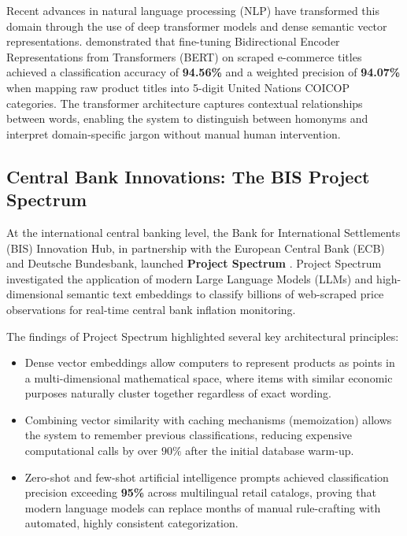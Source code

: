 \hs Recent advances in natural language processing (NLP) have transformed this domain through the use of deep transformer models and dense semantic vector representations. \cite{berki2025nlp} demonstrated that fine-tuning Bidirectional Encoder Representations from Transformers (BERT) on scraped e-commerce titles achieved a classification accuracy of \textbf{94.56\%} and a weighted precision of \textbf{94.07\%} when mapping raw product titles into 5-digit United Nations COICOP categories. The transformer architecture captures contextual relationships between words, enabling the system to distinguish between homonyms and interpret domain-specific jargon without manual human intervention.

\subsection{Central Bank Innovations: The BIS Project Spectrum}
\hs At the international central banking level, the Bank for International Settlements (BIS) Innovation Hub, in partnership with the European Central Bank (ECB) and Deutsche Bundesbank, launched \textbf{Project Spectrum} \citep{bis2024spectrum}. Project Spectrum investigated the application of modern Large Language Models (LLMs) and high-dimensional semantic text embeddings to classify billions of web-scraped price observations for real-time central bank inflation monitoring.

\hs The findings of Project Spectrum highlighted several key architectural principles:
\begin{itemize}
    \item Dense vector embeddings allow computers to represent products as points in a multi-dimensional mathematical space, where items with similar economic purposes naturally cluster together regardless of exact wording.
    \item Combining vector similarity with caching mechanisms (memoization) allows the system to remember previous classifications, reducing expensive computational calls by over $90\%$ after the initial database warm-up.
    \item Zero-shot and few-shot artificial intelligence prompts achieved classification precision exceeding \textbf{95\%} across multilingual retail catalogs, proving that modern language models can replace months of manual rule-crafting with automated, highly consistent categorization.
\end{itemize}

